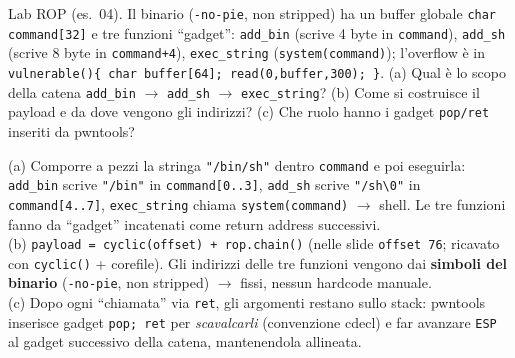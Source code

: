\question[7]
Lab ROP (es.\ 04). Il binario (\lstinline|-no-pie|, non stripped) ha un buffer globale \lstinline|char command[32]| e tre funzioni ``gadget'': \lstinline|add_bin| (scrive 4 byte in \lstinline|command|), \lstinline|add_sh| (scrive 8 byte in \lstinline|command+4|), \lstinline|exec_string| (\lstinline|system(command)|); l'overflow è in \lstinline|vulnerable(){ char buffer[64]; read(0,buffer,300); }|.
(a) Qual è lo scopo della catena \lstinline|add_bin| $\to$ \lstinline|add_sh| $\to$ \lstinline|exec_string|? (b) Come si costruisce il payload e da dove vengono gli indirizzi? (c) Che ruolo hanno i gadget \lstinline|pop/ret| inseriti da pwntools?
\begin{solution}
(a) Comporre a pezzi la stringa \lstinline|"/bin/sh"| dentro \lstinline|command| e poi eseguirla: \lstinline|add_bin| scrive \lstinline|"/bin"| in \lstinline|command[0..3]|, \lstinline|add_sh| scrive \lstinline|"/sh\0"| in \lstinline|command[4..7]|, \lstinline|exec_string| chiama \lstinline|system(command)| $\to$ shell. Le tre funzioni fanno da ``gadget'' incatenati come return address successivi.\\
(b) \lstinline|payload = cyclic(offset) + rop.chain()| (nelle slide \lstinline|offset 76|; ricavato con \lstinline|cyclic()| + corefile). Gli indirizzi delle tre funzioni vengono dai \textbf{simboli del binario} (\lstinline|-no-pie|, non stripped) $\to$ fissi, nessun hardcode manuale.\\
(c) Dopo ogni ``chiamata'' via \lstinline|ret|, gli argomenti restano sullo stack: pwntools inserisce gadget \lstinline|pop; ret| per \emph{scavalcarli} (convenzione cdecl) e far avanzare \lstinline|ESP| al gadget successivo della catena, mantenendola allineata.
\end{solution}
